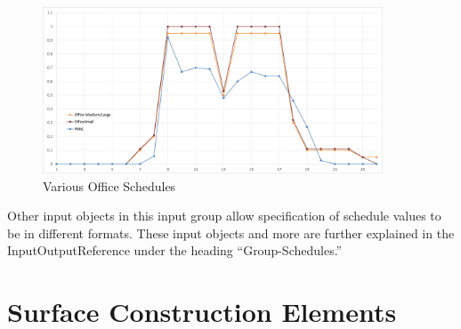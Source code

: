 \begin{figure}[hbtp] 
\centering
\includegraphics[width=0.9\textwidth, height=0.9\textheight, keepaspectratio=true]{media/officeSchedules.png}
\caption{Various Office Schedules}
\end{figure}


Other input objects in this input group allow specification of schedule
values to be in different formats. These input objects and more are
further explained in the InputOutputReference under the heading ``Group-Schedules.''

\section{Surface Construction Elements}

